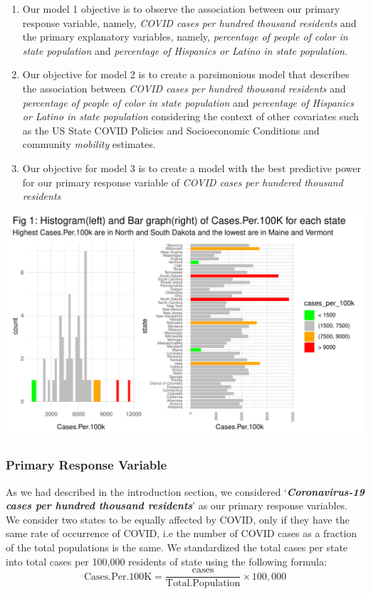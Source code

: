 \documentclass[
]{article}
\providecommand{\tightlist}{%
  \setlength{\itemsep}{0pt}\setlength{\parskip}{0pt}}
\begin{document}
\begin{enumerate}
\def\labelenumi{\arabic{enumi}.}
\tightlist
\item
  Our model 1 objective is to observe the association between our
  primary response variable, namely, \emph{COVID cases per hundred
  thousand residents} and the primary explanatory variables, namely,
  \emph{percentage of people of color in state population} and
  \emph{percentage of Hispanics or Latino in state population}.
\item
  Our objective for model 2 is to create a parsimonious model that
  describes the association between \emph{COVID cases per hundred
  thousand residents} and \emph{percentage of people of color in state
  population} and \emph{percentage of Hispanics or Latino in state
  population} considering the context of other covariates such as the US
  State COVID Policies and Socioeconomic Conditions and community
  \emph{mobility} estimates.
\item
  Our objective for model 3 is to create a model with the best
  predictive power for our primary response variable of \emph{COVID
  cases per hundered thousand residents}
\end{enumerate}

\includegraphics{Final_Report_files/figure-latex/cases_per_100k-1.pdf}

\hypertarget{primary-response-variable}{%
\subsubsection{Primary Response
Variable}\label{primary-response-variable}}

As we had described in the introduction section, we considered
`\textbf{\emph{Coronavirus-19 cases per hundred thousand residents}}' as
our primary response variables. We consider two states to be equally
affected by COVID, only if they have the same rate of occurrence of
COVID, i.e the number of COVID cases as a fraction of the total
populations is the same. We standardized the total cases per state into
total cases per 100,000 residents of state using the following formula:
\[
\text{Cases.Per.100K} = \frac{\text{cases}}{\text{Total.Population}}\times100,000
\]
\end{document}
